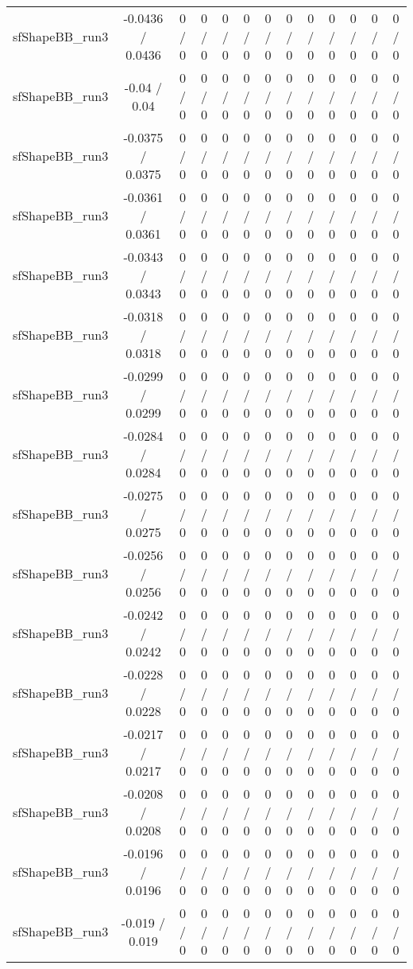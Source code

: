 \documentclass[10pt]{article}
\begin{document}
\begin{table}[htbp]
\begin{center}
\begin{tabular}{|c|c|c|c|c|c|c|c|c|c|c|c|c|}
  sfShapeBB_run3 & -0.0436 / 0.0436 & 0 / 0 & 0 / 0 & 0 / 0 & 0 / 0 & 0 / 0 & 0 / 0 & 0 / 0 & 0 / 0 & 0 / 0 & 0 / 0 & 0 / 0 \\ 
  sfShapeBB_run3 & -0.04 / 0.04 & 0 / 0 & 0 / 0 & 0 / 0 & 0 / 0 & 0 / 0 & 0 / 0 & 0 / 0 & 0 / 0 & 0 / 0 & 0 / 0 & 0 / 0 \\ 
  sfShapeBB_run3 & -0.0375 / 0.0375 & 0 / 0 & 0 / 0 & 0 / 0 & 0 / 0 & 0 / 0 & 0 / 0 & 0 / 0 & 0 / 0 & 0 / 0 & 0 / 0 & 0 / 0 \\ 
  sfShapeBB_run3 & -0.0361 / 0.0361 & 0 / 0 & 0 / 0 & 0 / 0 & 0 / 0 & 0 / 0 & 0 / 0 & 0 / 0 & 0 / 0 & 0 / 0 & 0 / 0 & 0 / 0 \\ 
  sfShapeBB_run3 & -0.0343 / 0.0343 & 0 / 0 & 0 / 0 & 0 / 0 & 0 / 0 & 0 / 0 & 0 / 0 & 0 / 0 & 0 / 0 & 0 / 0 & 0 / 0 & 0 / 0 \\ 
  sfShapeBB_run3 & -0.0318 / 0.0318 & 0 / 0 & 0 / 0 & 0 / 0 & 0 / 0 & 0 / 0 & 0 / 0 & 0 / 0 & 0 / 0 & 0 / 0 & 0 / 0 & 0 / 0 \\ 
  sfShapeBB_run3 & -0.0299 / 0.0299 & 0 / 0 & 0 / 0 & 0 / 0 & 0 / 0 & 0 / 0 & 0 / 0 & 0 / 0 & 0 / 0 & 0 / 0 & 0 / 0 & 0 / 0 \\ 
  sfShapeBB_run3 & -0.0284 / 0.0284 & 0 / 0 & 0 / 0 & 0 / 0 & 0 / 0 & 0 / 0 & 0 / 0 & 0 / 0 & 0 / 0 & 0 / 0 & 0 / 0 & 0 / 0 \\ 
  sfShapeBB_run3 & -0.0275 / 0.0275 & 0 / 0 & 0 / 0 & 0 / 0 & 0 / 0 & 0 / 0 & 0 / 0 & 0 / 0 & 0 / 0 & 0 / 0 & 0 / 0 & 0 / 0 \\ 
  sfShapeBB_run3 & -0.0256 / 0.0256 & 0 / 0 & 0 / 0 & 0 / 0 & 0 / 0 & 0 / 0 & 0 / 0 & 0 / 0 & 0 / 0 & 0 / 0 & 0 / 0 & 0 / 0 \\ 
  sfShapeBB_run3 & -0.0242 / 0.0242 & 0 / 0 & 0 / 0 & 0 / 0 & 0 / 0 & 0 / 0 & 0 / 0 & 0 / 0 & 0 / 0 & 0 / 0 & 0 / 0 & 0 / 0 \\ 
  sfShapeBB_run3 & -0.0228 / 0.0228 & 0 / 0 & 0 / 0 & 0 / 0 & 0 / 0 & 0 / 0 & 0 / 0 & 0 / 0 & 0 / 0 & 0 / 0 & 0 / 0 & 0 / 0 \\ 
  sfShapeBB_run3 & -0.0217 / 0.0217 & 0 / 0 & 0 / 0 & 0 / 0 & 0 / 0 & 0 / 0 & 0 / 0 & 0 / 0 & 0 / 0 & 0 / 0 & 0 / 0 & 0 / 0 \\ 
  sfShapeBB_run3 & -0.0208 / 0.0208 & 0 / 0 & 0 / 0 & 0 / 0 & 0 / 0 & 0 / 0 & 0 / 0 & 0 / 0 & 0 / 0 & 0 / 0 & 0 / 0 & 0 / 0 \\ 
  sfShapeBB_run3 & -0.0196 / 0.0196 & 0 / 0 & 0 / 0 & 0 / 0 & 0 / 0 & 0 / 0 & 0 / 0 & 0 / 0 & 0 / 0 & 0 / 0 & 0 / 0 & 0 / 0 \\ 
  sfShapeBB_run3 & -0.019 / 0.019 & 0 / 0 & 0 / 0 & 0 / 0 & 0 / 0 & 0 / 0 & 0 / 0 & 0 / 0 & 0 / 0 & 0 / 0 & 0 / 0 & 0 / 0 \\ 

\end{tabular}
\end{center}
\end{table}
\end{document}
